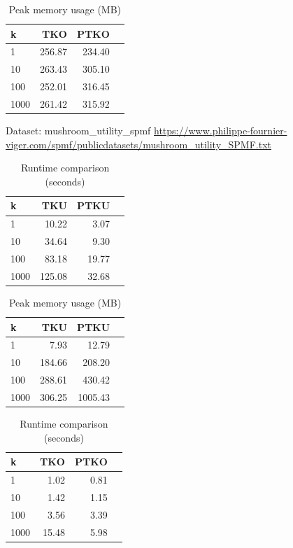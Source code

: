 \begin{table}[H]
\caption{Peak memory usage (MB)}\label{tab:memory}
\centering
\begin{tabular}{@{}lrrr@{}}
\toprule
\textbf{k} & \textbf{TKO} & \textbf{PTKO} \\
\midrule
1 & 256.87 & 234.40 \\
10 & 263.43 & 305.10 \\
100 & 252.01 & 316.45 \\
1000 & 261.42 & 315.92 \\

\bottomrule
\end{tabular}
\end{table}

Dataset: mushroom\_utility\_spmf
\url{https://www.philippe-fournier-viger.com/spmf/publicdatasets/mushroom_utility_SPMF.txt}

\begin{table}[H]
\caption{Runtime comparison (seconds)}\label{tab:runtime}
\centering
\begin{tabular}{@{}lrrr@{}}
\toprule
\textbf{k} & \textbf{TKU} & \textbf{PTKU} \\
\midrule
1 & 10.22 & 3.07  \\
10 & 34.64 & 9.30  \\
100 & 83.18 & 19.77 \\
1000 & 125.08 & 32.68 \\
\bottomrule
\end{tabular}
\end{table}

\begin{table}[H]
\caption{Peak memory usage (MB)}\label{tab:memory}
\centering
\begin{tabular}{@{}lrrr@{}}
\toprule
\textbf{k} & \textbf{TKU} & \textbf{PTKU} \\
\midrule
1 & 7.93 & 12.79  \\
10 & 184.66 & 208.20  \\
100 & 288.61 & 430.42 \\
1000 & 306.25 & 1005.43 \\

\bottomrule
\end{tabular}
\end{table}

\begin{table}[H]
\caption{Runtime comparison (seconds)}\label{tab:runtime}
\centering
\begin{tabular}{@{}lrrr@{}}
\toprule
\textbf{k} & \textbf{TKO} & \textbf{PTKO} \\
\midrule
1 & 1.02 & 0.81 \\
10 &  1.42 & 1.15 \\
100 & 3.56 & 3.39 \\
1000 & 15.48 & 5.98 \\
\bottomrule
\end{tabular}
\end{table}

